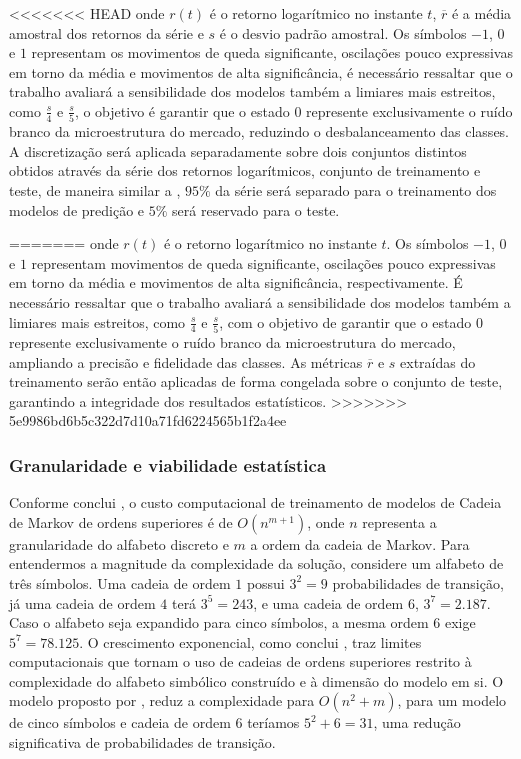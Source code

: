 \documentclass[
    12pt,                %
    openright,           %
    oneside,             %
    a4paper,             %
    english,             %
    brazil               %
]{abntex2}
\begin{document}
<<<<<<< HEAD
onde $r(t)$ é o retorno logarítmico no instante $t$, $\overline{r}$ é a média amostral dos retornos da série e $s$
é o desvio padrão amostral. Os símbolos $-1$, $0$ e $1$ representam os movimentos de queda significante, oscilações pouco expressivas em torno da média e movimentos de alta 
significância, é necessário ressaltar que o trabalho avaliará a sensibilidade dos modelos também a limiares mais estreitos, como $\frac{s}{4}$ e $\frac{s}{5}$, o 
objetivo é garantir que o estado $0$ represente exclusivamente o ruído branco da microestrutura do mercado, reduzindo o desbalanceamento das classes. A discretização 
será aplicada separadamente sobre dois conjuntos distintos obtidos através da série dos retornos logarítmicos, conjunto de treinamento e teste, de maneira similar a 
, $95\%$ da série será separado para o treinamento dos modelos de predição e $5\%$ será reservado para o teste.

=======
onde $r(t)$ é o retorno logarítmico no instante $t$. Os símbolos $-1$, $0$ e $1$ representam movimentos de queda significante, oscilações pouco 
expressivas em torno da média e movimentos de alta significância, respectivamente. É necessário ressaltar que o trabalho avaliará a sensibilidade 
dos modelos também a limiares mais estreitos, como $\frac{s}{4}$ e $\frac{s}{5}$, com o objetivo de garantir que o estado $0$ represente exclusivamente o 
ruído branco da microestrutura do mercado, ampliando a precisão e fidelidade das classes. As métricas $\overline{r}$ e $s$ extraídas do treinamento serão 
então aplicadas de forma congelada sobre o conjunto de teste, garantindo a integridade dos resultados estatísticos.
>>>>>>> 5e9986bd6b5c322d7d10a71fd6224565b1f2a4ee

\subsubsection{Granularidade e viabilidade estatística}

Conforme conclui , o custo computacional de treinamento de modelos de Cadeia de Markov de ordens superiores é de $O(n^{m+1})$, onde $n$ representa 
a granularidade do alfabeto discreto e $m$ a ordem da cadeia de Markov. Para entendermos a magnitude da complexidade da solução, considere um alfabeto de 
três símbolos. Uma cadeia de ordem $1$ possui $3^2=9$ probabilidades de transição, já uma cadeia de ordem $4$ terá $3^5=243$, e uma cadeia de ordem 6, $3^7=2.187$. 
Caso o alfabeto seja expandido para cinco símbolos, a mesma ordem 6 exige $5^7=78.125$. O crescimento exponencial, como conclui , traz limites computacionais 
que tornam o uso de cadeias de ordens superiores restrito à complexidade do alfabeto simbólico construído e à dimensão do modelo em si. 
O modelo proposto por , reduz a complexidade para $O(n^2+m)$, para um modelo de cinco símbolos e 
cadeia de ordem $6$ teríamos $5^2+6=31$, uma redução significativa de probabilidades de transição.
\end{document}
